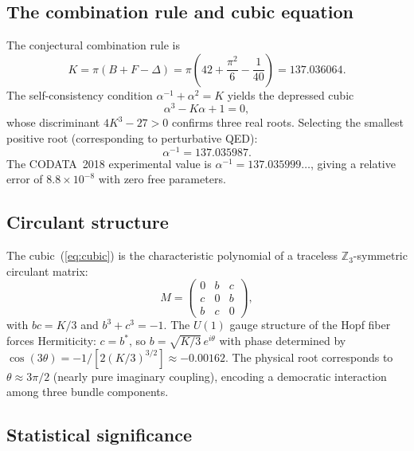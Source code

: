 \documentclass[aps,pra,twocolumn,superscriptaddress,longbibliography]{revtex4-2}
\begin{document}
\subsection{The combination rule and cubic equation}

The conjectural combination rule is
\begin{equation}
K = \pi\!\left(B + F - \Delta\right) = \pi\!\left(42 + \frac{\pi^2}{6}
- \frac{1}{40}\right) = 137.036064.
\label{eq:combination_rule}
\end{equation}
The self-consistency condition $\alpha^{-1} + \alpha^2 = K$ yields
the depressed cubic
\begin{equation}
\alpha^3 - K\alpha + 1 = 0,
\label{eq:cubic}
\end{equation}
whose discriminant $4K^3 - 27 > 0$ confirms three real roots.
Selecting the smallest positive root (corresponding to perturbative
QED):
\begin{equation}
\alpha^{-1} = 137.035987.
\label{eq:alpha_result}
\end{equation}
The CODATA~2018 experimental value is
$\alpha^{-1} = 137.035999\ldots$, giving a relative error of
$8.8 \times 10^{-8}$ with zero free parameters.

\subsection{Circulant structure}

The cubic~(\ref{eq:cubic}) is the characteristic polynomial of a
traceless $\mathbb{Z}_3$-symmetric circulant matrix:
\begin{equation}
M = \begin{pmatrix} 0 & b & c \\ c & 0 & b \\ b & c & 0 \end{pmatrix},
\label{eq:circulant}
\end{equation}
with $bc = K/3$ and $b^3 + c^3 = -1$.  The $U(1)$ gauge structure of
the Hopf fiber forces Hermiticity: $c = b^*$, so
$b = \sqrt{K/3}\, e^{i\theta}$ with phase determined by
$\cos(3\theta) = -1/[2(K/3)^{3/2}] \approx -0.00162$.  The physical
root corresponds to $\theta \approx 3\pi/2$ (nearly pure imaginary
coupling), encoding a democratic interaction among three bundle
components.

\subsection{Statistical significance}
\end{document}
